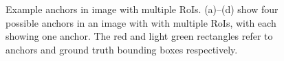 \begin{figure}[!h]
    \caption[Example anchors in image with multiple RoIs]{Example anchors in image  with multiple RoIs. (a)--(d) show four possible anchors in an image with  with multiple RoIs, with each showing one anchor. The red and light green rectangles refer to anchors and ground truth bounding boxes respectively.}
	\label{fig:eganchor}
\end{figure}